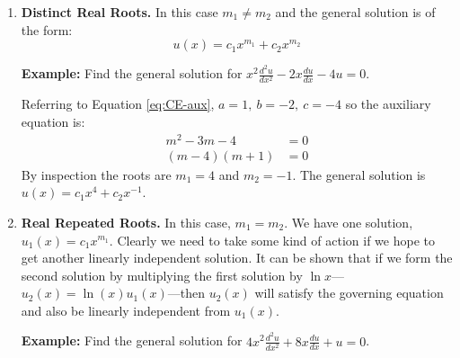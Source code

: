 \begin{enumerate}
\item \textbf{Distinct Real Roots.} In this case $m_1 \ne m_2$ and the general solution is of the form:
\begin{equation}
u(x)=c_1x^{m_1}+c_2x^{m_2}
\end{equation}

\vspace{0.5cm}

\noindent\textbf{Example:} Find the general solution for $x^2\frac{d^2u}{dx^2}-2x\frac{du}{dx}-4u=0$.

\vspace{0.25cm}

\noindent Referring to Equation \ref{eq:CE-aux}, $a=1,\ b=-2, \ c=-4$ so the auxiliary equation is:
\begin{align*}
m^2-3m-4 &= 0 \\
(m-4)(m+1) &=0
\end{align*}
By inspection the roots are $m_1=4$ and $m_2=-1$.  The general solution is $u(x)=c_1x^4+c_2x^{-1}$.

\vspace{0.5cm}

\item \textbf{Real Repeated Roots.} In this case, $m_1 = m_2$.  We have one solution, $u_1(x)=c_1x^{m_1}$.  Clearly we need to take some kind of action if we hope to get another linearly independent solution.  It can be shown that if we form the second solution by multiplying the first solution by $\ln{x}$---$u_2(x)=\ln{(x)}u_1(x)$---then $u_2(x)$ will satisfy the governing equation and also be linearly independent from $u_1(x)$.

\vspace{0.5cm}

\noindent\textbf{Example:} Find the general solution for $4x^2 \frac{d^2u}{dx^2}+8x\frac{du}{dx}+u=0$.


\end{enumerate}
